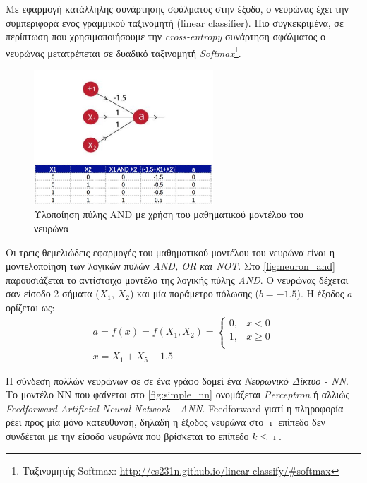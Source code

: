 Με εφαρμογή κατάλληλης
συνάρτησης σφάλματος στην έξοδο, ο νευρώνας έχει την συμπεριφορά ενός γραμμικού ταξινομητή
(linear classifier). Πιο συγκεκριμένα, σε περίπτωση που χρησιμοποιήσουμε την \emph{cross-entropy}
συνάρτηση σφάλματος ο νευρώνας μετατρέπεται σε δυαδικό ταξινομητή \emph{Softmax}\footnote{Ταξινομητής Softmax: \url{http://cs231n.github.io/linear-classify/\#softmax}}.

\begin{figure}[!ht]
  \centering
  \includegraphics[width=0.6\textwidth]{./images/chapter3/perceptron_and.jpg}
  \caption[Υλοποίηση πύλης AND με χρήση του μαθηματικού μοντέλου του νευρώνα]{Υλοποίηση πύλης AND με χρήση του μαθηματικού μοντέλου του νευρώνα}
  \label{fig:neuron_and}
\end{figure}

Οι τρεις θεμελιώδεις εφαρμογές του μαθηματικού μοντέλου του νευρώνα είναι η
μοντελοποίηση των λογικών πυλών \emph{AND, OR και NOT}. Στο \autoref{fig:neuron_and}
παρουσιάζεται το αντίστοιχο μοντέλο της λογικής πύλης \emph{AND}. Ο νευρώνας
δέχεται σαν είσοδο 2 σήματα ($X_{1}$,  $X_{2}$) και μία παράμετρο πόλωσης ($b=-1.5$).
Η έξοδος $a$ ορίζεται ως:
\begin{gather*}
  a = f(x) = f(X_{1}, X_{2}) =
  \begin{cases}
    0, & x < 0 \\
    1, & x \geq 0 \\
  \end{cases} \\
   x = X_{1} + X_{5} - 1.5
\end{gather*}

Η σύνδεση πολλών νευρώνων σε σε ένα γράφο δομεί ένα \emph{Νευρωνικό Δίκτυο - ΝΝ}.
Το μοντέλο ΝΝ που φαίνεται στο \autoref{fig:simple_nn}
ονομάζεται \emph{Perceptron} ή αλλιώς
\emph{Feedforward Artificial Neural Network - ANN}.
Feedforward γιατί η πληροφορία ρέει προς μία μόνο κατεύθυνση, δηλαδή
η έξοδος νευρώνα στο $\imath$ επίπεδο δεν συνδέεται με την είσοδο νευρώνα
που βρίσκεται το επίπεδο $k \leq \imath$.

